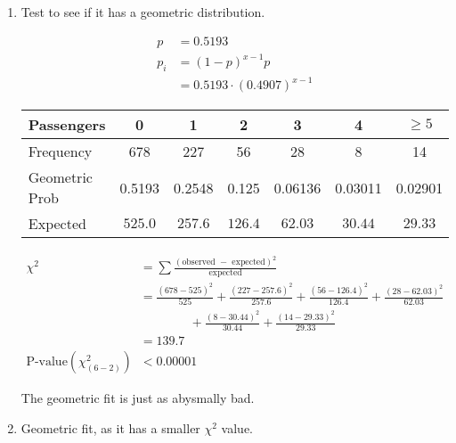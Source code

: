 \documentclass{article}
\begin{document}
\begin{enumerate}[\quad(a)]
\item Test to see if it has a geometric distribution.

\begin{align*}
	p &= 0.5193 \\
	p_i &= (1 - p)^{x - 1}p\\
	&= 0.5193 \cdot (0.4907)^{x - 1}
\end{align*}

\begin{center}
	\begin{tabular}{|l|c|c|c|c|c|c|}
	\hline
	Passengers & 0 & 1 & 2 & 3 & 4 & $\geq 5$ \\ 
	\hline
	Frequency & 678 & 227 & 56 & 28 & 8 & 14 \\
	\hline
	Geometric Prob & 0.5193 & 0.2548 & 0.125 & 0.06136 & 0.03011 & 0.02901 \\
	\hline
	Expected & $ \mathit{525.0} $ & $\mathit{257.6}$ & $\mathit{126.4}$ & $\mathit{62.03}$ & $\mathit{30.44}$ & $\mathit{29.33}$ \\
	\hline
	\end{tabular}
\end{center}

\begin{align*}
	\chi^2 &= \sum \frac{(\text{observed } - \text{ expected})^2}{\text{expected}}\\
	&= \frac{(678 - 525)^2}{525} + \frac{(227 - 257.6)^2}{257.6} + \frac{(56 - 126.4)^2}{126.4} + \frac{(28 - 62.03)^2}{62.03} \\
	&\qquad\qquad + \frac{(8 - 30.44)^2}{30.44} + \frac{(14 - 29.33)^2}{29.33}\\
	&= 139.7\\
	\text{P-value}(\chi^2_{(6-2)}) &< 0.00001
\end{align*}

The geometric fit is just as abysmally bad.

\item Geometric fit, as it has a smaller $\chi^2$ value.

\end{enumerate}
\end{document}
